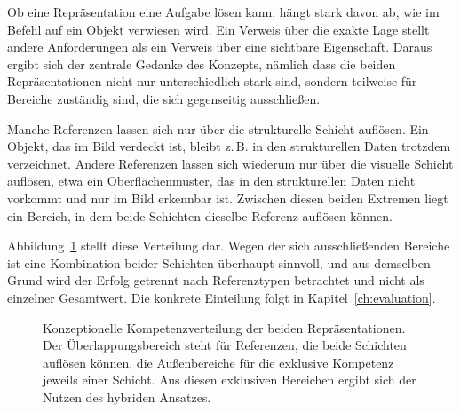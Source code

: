 Ob eine Repräsentation eine Aufgabe lösen kann, hängt stark davon ab, wie im Befehl auf ein Objekt verwiesen wird.
Ein Verweis über die exakte Lage stellt andere Anforderungen als ein Verweis über eine sichtbare Eigenschaft.
Daraus ergibt sich der zentrale Gedanke des Konzepts, nämlich dass die beiden Repräsentationen nicht nur unterschiedlich stark sind, sondern teilweise für Bereiche zuständig sind, die sich gegenseitig ausschließen.

Manche Referenzen lassen sich nur über die strukturelle Schicht auflösen.
Ein Objekt, das im Bild verdeckt ist, bleibt z.\,B. in den strukturellen Daten trotzdem verzeichnet.
Andere Referenzen lassen sich wiederum nur über die visuelle Schicht auflösen, etwa ein Oberflächenmuster, das in den strukturellen Daten nicht vorkommt und nur im Bild erkennbar ist.
Zwischen diesen beiden Extremen liegt ein Bereich, in dem beide Schichten dieselbe Referenz auflösen können.

Abbildung~\ref{fig:venn} stellt diese Verteilung dar.
Wegen der sich ausschließenden Bereiche ist eine Kombination beider Schichten überhaupt sinnvoll, und aus demselben Grund wird der Erfolg getrennt nach Referenztypen betrachtet und nicht als einzelner Gesamtwert.
Die konkrete Einteilung folgt in Kapitel~\ref{ch:evaluation}.

\begin{figure}[htbp]
  \centering
  \caption{Konzeptionelle Kompetenzverteilung der beiden Repräsentationen. Der Überlappungsbereich steht für Referenzen, die beide Schichten auflösen können, die Außenbereiche für die exklusive Kompetenz jeweils einer Schicht. Aus diesen exklusiven Bereichen ergibt sich der Nutzen des hybriden Ansatzes.}
  \label{fig:venn}
\end{figure}
